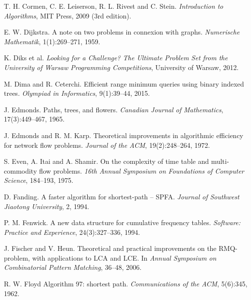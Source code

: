 \begin{thebibliography}{9}
    T. H. Cormen, C. E. Leiserson, R. L. Rivest and C. Stein.
    \emph{Introduction to Algorithms}, MIT Press, 2009 (3rd edition).

    E. W. Dijkstra.
    A note on two problems in connexion with graphs.
    \emph{Numerische Mathematik}, 1(1):269--271, 1959.

    K. Diks et al.
    \emph{Looking for a Challenge? The Ultimate Problem Set from
        the University of Warsaw Programming Competitions}, University of Warsaw, 2012.



    M. Dima and R. Ceterchi.
    Efficient range minimum queries using binary indexed trees.
    \emph{Olympiad in Informatics}, 9(1):39--44, 2015.

    J. Edmonds.
    Paths, trees, and flowers.
    \emph{Canadian Journal of Mathematics}, 17(3):449--467, 1965.

    J. Edmonds and R. M. Karp.
    Theoretical improvements in algorithmic efficiency for network flow problems.
    \emph{Journal of the ACM}, 19(2):248--264, 1972.

    S. Even, A. Itai and A. Shamir.
    On the complexity of time table and multi-commodity flow problems.
    \emph{16th Annual Symposium on Foundations of Computer Science}, 184--193, 1975.

    D. Fanding.
    A faster algorithm for shortest-path -- SPFA.
    \emph{Journal of Southwest Jiaotong University}, 2, 1994.

    P. M. Fenwick.
    A new data structure for cumulative frequency tables.
    \emph{Software: Practice and Experience}, 24(3):327--336, 1994.

    J. Fischer and V. Heun.
    Theoretical and practical improvements on the RMQ-problem, with applications to LCA and LCE.
    In \emph{Annual Symposium on Combinatorial Pattern Matching}, 36--48, 2006.

    R. W. Floyd
    Algorithm 97: shortest path.
    \emph{Communications of the ACM}, 5(6):345, 1962.


\end{thebibliography}
